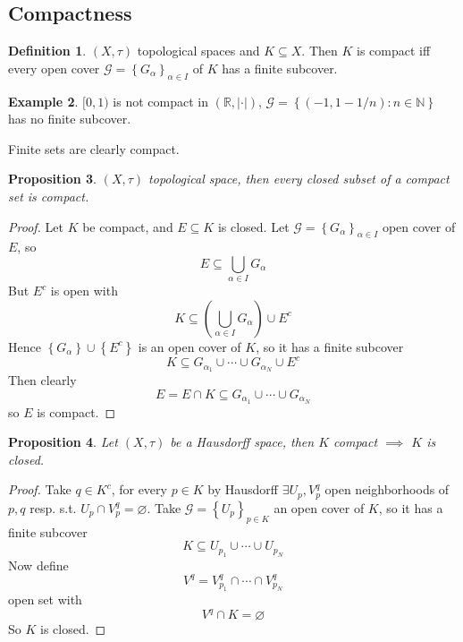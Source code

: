 \documentclass[11pt,a4paper]{article}
\theoremstyle{definition}
\newtheorem{definition}{Definition}[section]
\newtheorem{example}[definition]{Example}
\theoremstyle{plain}
\newtheorem{proposition}[definition]{Proposition}
\theoremstyle{remark}
\newcommand{\R}{\mathbb{R}}
\newcommand{\N}{\mathbb{N}}
\renewcommand{\set}[1]{\left\{ #1 \right\}}
\newcommand{\abs}[1]{\lvert #1 \rvert}
\newcommand{\1}{\mathbbm{1}}
\begin{document}
\subsection{Compactness}

\begin{definition}
    $(X, \tau)$ topological spaces and $K \subseteq X$. Then $K$ is compact iff every open cover $\mathcal{G} = \set{G_\alpha}_{\alpha \in I}$ of $K$ has a finite subcover.
\end{definition}

\begin{example}
    $[0,1)$ is not compact in $(\R, \abs{\cdot})$, $\mathcal{G} = \set{(-1, 1-1/n) \colon n \in \N}$ has no finite subcover.

    Finite sets are clearly compact. 
\end{example}

\begin{proposition}
    $(X, \tau)$ topological space, then every closed subset of a compact set is compact. 
\end{proposition}

\begin{proof}
    Let $K$ be compact, and $E \subseteq K$ is closed. Let $\mathcal{G} = \set{G_\alpha}_{\alpha \in I}$ open cover of $E$, so 
    $$E \subseteq \bigcup_{\alpha \in I} G_\alpha$$
    But $E^c$ is open with 
    $$K \subseteq \left(\bigcup_{\alpha \in I} G_\alpha \right)\cup E^c$$
    Hence $\set{G_\alpha} \cup \set{E^c}$ is an open cover of $K$, so it has a finite subcover 
    $$K \subseteq G_{\alpha_1} \cup \cdots \cup G_{\alpha_N} \cup E^c$$
    Then clearly 
    $$E = E \cap K \subseteq G_{\alpha_1} \cup \cdots \cup G_{\alpha_N}$$
    so $E$ is compact. 
\end{proof}

\begin{proposition}
    Let $(X, \tau)$ be a Hausdorff space, then $K$ compact $\implies$ $K$ is closed. 
\end{proposition}

\begin{proof}
    Take $q \in K^c$, for every $p \in K$ by Hausdorff $\exists U_p, V_{p}^q$ open neighborhoods of $p, q$ resp. s.t. 
    $U_p \cap V_p^q = \varnothing$. Take $\mathcal{G} = \set{U_p}_{p \in K}$ an open cover of $K$, so it has a finite subcover 
    $$K \subseteq U_{p_1} \cup \cdots \cup U_{p_N}$$
    Now define 
    $$V^q = V_{p_1}^q \cap \cdots \cap V_{p_N}^q$$
    open set with 
    $$V^q \cap K = \varnothing$$
    So $K$ is closed. 
\end{proof}
\end{document}
